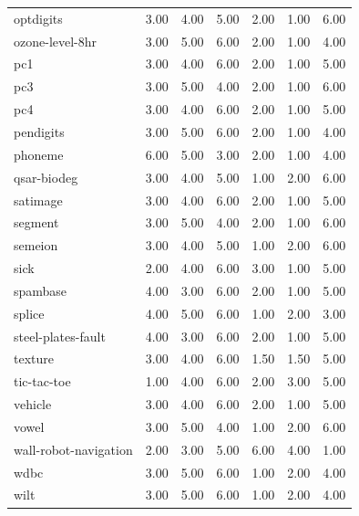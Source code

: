 \begin{table}[htbp]
\begin{tabular}{lrrrrrr}
optdigits & 3.00 & 4.00 & 5.00 & 2.00 & 1.00 & 6.00 \\
ozone-level-8hr & 3.00 & 5.00 & 6.00 & 2.00 & 1.00 & 4.00 \\
pc1 & 3.00 & 4.00 & 6.00 & 2.00 & 1.00 & 5.00 \\
pc3 & 3.00 & 5.00 & 4.00 & 2.00 & 1.00 & 6.00 \\
pc4 & 3.00 & 4.00 & 6.00 & 2.00 & 1.00 & 5.00 \\
pendigits & 3.00 & 5.00 & 6.00 & 2.00 & 1.00 & 4.00 \\
phoneme & 6.00 & 5.00 & 3.00 & 2.00 & 1.00 & 4.00 \\
qsar-biodeg & 3.00 & 4.00 & 5.00 & 1.00 & 2.00 & 6.00 \\
satimage & 3.00 & 4.00 & 6.00 & 2.00 & 1.00 & 5.00 \\
segment & 3.00 & 5.00 & 4.00 & 2.00 & 1.00 & 6.00 \\
semeion & 3.00 & 4.00 & 5.00 & 1.00 & 2.00 & 6.00 \\
sick & 2.00 & 4.00 & 6.00 & 3.00 & 1.00 & 5.00 \\
spambase & 4.00 & 3.00 & 6.00 & 2.00 & 1.00 & 5.00 \\
splice & 4.00 & 5.00 & 6.00 & 1.00 & 2.00 & 3.00 \\
steel-plates-fault & 4.00 & 3.00 & 6.00 & 2.00 & 1.00 & 5.00 \\
texture & 3.00 & 4.00 & 6.00 & 1.50 & 1.50 & 5.00 \\
tic-tac-toe & 1.00 & 4.00 & 6.00 & 2.00 & 3.00 & 5.00 \\
vehicle & 3.00 & 4.00 & 6.00 & 2.00 & 1.00 & 5.00 \\
vowel & 3.00 & 5.00 & 4.00 & 1.00 & 2.00 & 6.00 \\
wall-robot-navigation & 2.00 & 3.00 & 5.00 & 6.00 & 4.00 & 1.00 \\
wdbc & 3.00 & 5.00 & 6.00 & 1.00 & 2.00 & 4.00 \\
wilt & 3.00 & 5.00 & 6.00 & 1.00 & 2.00 & 4.00 \\
\hline
\end{tabular}
\end{table}
